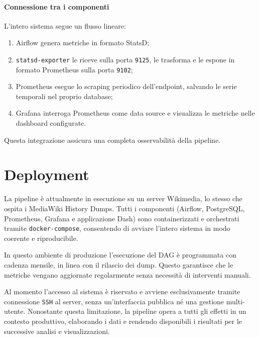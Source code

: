 \paragraph{Connessione tra i componenti}
L’intero sistema segue un flusso lineare:
\begin{enumerate}
    \item Airflow genera metriche in formato StatsD;
    \item \texttt{statsd-exporter} le riceve sulla porta \texttt{9125}, le trasforma e le espone in formato Prometheus sulla porta \texttt{9102};
    \item Prometheus esegue lo scraping periodico dell’endpoint, salvando le serie temporali nel proprio database;
    \item Grafana interroga Prometheus come data source e visualizza le metriche nelle dashboard configurate.
\end{enumerate}
Questa integrazione assicura una completa osservabilità della pipeline.

\section{Deployment}
\label{sec:impldeployment}

La pipeline è attualmente in esecuzione su un server Wikimedia, lo stesso che ospita 
i MediaWiki History Dumps. Tutti i componenti (Airflow, PostgreSQL, Prometheus, 
Grafana e applicazione Dash) sono containerizzati e orchestrati tramite 
\texttt{docker-compose}, consentendo di avviare l’intero sistema in modo coerente 
e riproducibile. 

In questo ambiente di produzione l'esecuzione del DAG  è programmata 
con cadenza mensile, in linea con il rilascio dei dump. 
Questo garantisce che le metriche vengano aggiornate regolarmente senza 
necessità di interventi manuali. 

Al momento l’accesso al sistema è riservato e avviene esclusivamente tramite 
connessione \texttt{SSH} al server, senza un’interfaccia pubblica né una gestione 
multi-utente. Nonostante questa limitazione, la pipeline opera a tutti gli effetti 
in un contesto produttivo, elaborando i dati e rendendo disponibili i 
risultati per le successive analisi e visualizzazioni.

\clearpage